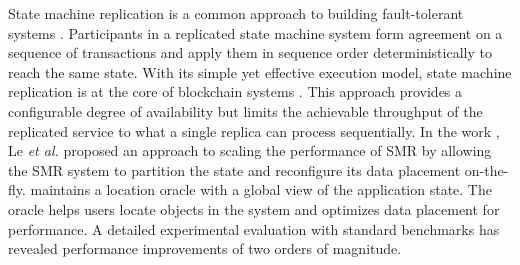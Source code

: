 State machine replication is a common approach to building fault-tolerant
systems \cite{Lam78, Sch90}. Participants in a replicated state machine system
form agreement on a sequence of transactions and apply them in sequence order
deterministically to reach the same state. With its simple yet effective
execution model, state machine replication is at the core of blockchain systems
\cite{baudet2019state, cachin2016architecture}. This approach provides a
configurable degree of availability but limits the achievable throughput of the
replicated service to what a single replica can process sequentially. In the
work \dynastar \cite{le2019dynastar}, Le \emph{et al.} proposed an approach to
scaling the performance of SMR by allowing the SMR system to partition the state
and reconfigure its data placement on-the-fly. \dynastar maintains a location
oracle with a global view of the application state. The oracle helps users
locate objects in the system and optimizes data placement for performance. A
detailed experimental evaluation with standard benchmarks has revealed
performance improvements of two orders of magnitude.
%
%

